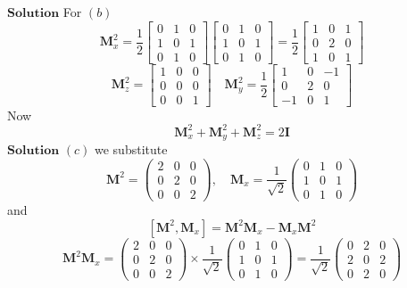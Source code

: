 $\boxed{\textbf{Solution}}$  For $(b)$
$$\mathbf{M}_{x}^{2}=\frac{1}{2}\left[\begin{array}{ccc}{0} & {1} & {0} \\ {1} & {0} & {1} \\ {0} & {1} & {0}\end{array}\right]\left[\begin{array}{ccc}{0} & {1} & {0} \\ {1} & {0} & {1} \\ {0} & {1} & {0}\end{array}\right]=\frac{1}{2}\left[\begin{array}{ccc}{1} & {0} & {1} \\ {0} & {2} & {0} \\ {1} & {0} & {1}\end{array}\right]$$
$$\mathbf{M}_z^2 = \left[\begin{array}{ccc}{1} & {0} & {0} \\ {0} & {0} & {0} \\ {0} & {0} & {1}\end{array}\right] \quad \mathbf{M}_y^2 = \dfrac{1}{2}\left[\begin{array}{ccc}{1} & {0} & {-1} \\ {0} & {2} & {0} \\ {-1} & {0} & {1}\end{array}\right]$$
Now
$$\mathbf{M}_x^2 + \mathbf{M}_y^2 + \mathbf{M}_z^2 = 2\mathbf{I}$$
$\boxed{\textbf{Solution}}$  $(c)$ we substitute
$$
\mathbf{M}^{2}=\left(\begin{array}{lll}
2 & 0 & 0 \\
0 & 2 & 0 \\
0 & 0 & 2
\end{array}\right), \quad \mathbf{M}_{x}=\frac{1}{\sqrt{2}}\left(\begin{array}{lll}
0 & 1 & 0 \\
1 & 0 & 1 \\
0 & 1 & 0
\end{array}\right)
$$
and
$$
\left[\mathbf{M}^{2}, \mathbf{M}_{x}\right]=\mathbf{M}^{2} \mathbf{M}_{x}-\mathbf{M}_{x} \mathbf{M}^{2}
$$
$$
\mathbf{M}^{2} \mathbf{M}_{x}=\left(\begin{array}{lll}
2 & 0 & 0 \\
0 & 2 & 0 \\
0 & 0 & 2
\end{array}\right) \times \frac{1}{\sqrt{2}}\left(\begin{array}{lll}
0 & 1 & 0 \\
1 & 0 & 1 \\
0 & 1 & 0
\end{array}\right)=\frac{1}{\sqrt{2}}\left(\begin{array}{lll}
0 & 2 & 0 \\
2 & 0 & 2 \\
0 & 2 & 0
\end{array}\right)
$$
